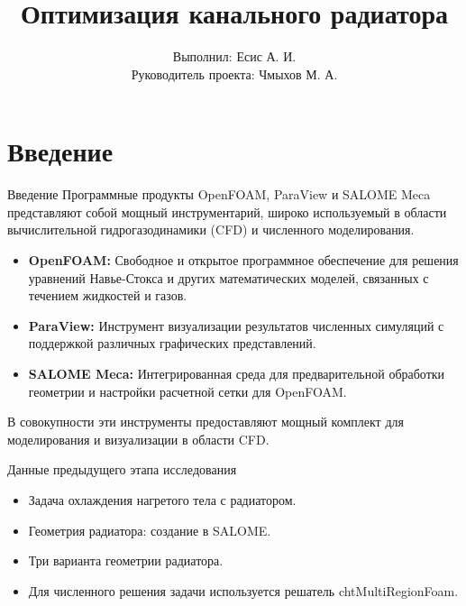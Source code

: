 \documentclass{beamer}
\begin{document}
\title{Оптимизация канального радиатора}
\author{Выполнил: Есис А. И.\\Руководитель проекта: Чмыхов М. А.}

\date{}


\maketitle

\section{Введение}
\begin{frame}{Введение}
	Программные продукты OpenFOAM, ParaView и SALOME Meca представляют собой мощный инструментарий, широко используемый в области вычислительной гидрогазодинамики (CFD) и численного моделирования.

	\begin{itemize}[label=•]
		\item \textbf{OpenFOAM:} Свободное и открытое программное обеспечение для решения уравнений Навье-Стокса и других математических моделей, связанных с течением жидкостей и газов.

		\item \textbf{ParaView:} Инструмент визуализации результатов численных симуляций с поддержкой различных графических представлений.

		\item \textbf{SALOME Meca:} Интегрированная среда для предварительной обработки геометрии и настройки расчетной сетки для OpenFOAM.
	\end{itemize}

	В совокупности эти инструменты предоставляют мощный комплект для моделирования и визуализации в области CFD.
\end{frame}

\begin{frame}{Данные предыдущего этапа исследования}
	\begin{itemize}[label=•]
		\item Задача охлаждения нагретого тела с радиатором.
		\item Геометрия радиатора: создание в SALOME.
		\item Три варианта геометрии радиатора.
		\item Для численного решения задачи используется решатель chtMultiRegionFoam.
	\end{itemize}
\end{frame}
\end{document}
